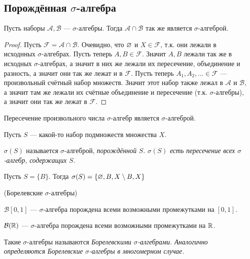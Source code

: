 \subsection{Порождённая $\sigma$-алгебра}
\begin{proposal}
    Пусть наборы $\mathcal{A}, \mathcal{B}$ --- $\sigma$-алгебры. Тогда $\mathcal{A} \cap \mathcal{B}$
    так же является $\sigma$-алгеброй.
\end{proposal}
\begin{proof}
    Пусть $\mathcal{F} = \mathcal{A} \cap \mathcal{B}$. Очевидно, что $\varnothing$ и $X \in \mathcal{F}$,
    т.к. они лежали в исходнных $\sigma$-алгебрах. Пусть теперь $A, B \in \mathcal{F}$. Значит $A, B$
    лежали так же в исходных $\sigma$-алгебрах, а значит в них же лежали их пересечение, объединение и
    разность, а значит они так же лежат и в $\mathcal{F}$. Пусть теперь $A_1, A_2, \ldots \in \mathcal{F}$
    --- произвольный счётный набор множеств. Значит этот набор также лежал в $\mathcal{A}$ и $\mathcal{B}$,
    а значит там же лежали их счётные объединение и пересечение (т.к. $\sigma$-алгебры), а значит они
    так же лежат в $\mathcal{F}$.
\end{proof}
\begin{corollary}
    Пересечение произвольного числа $\sigma$-алгебр является $\sigma$-алгеброй.
\end{corollary}
Пусть $S$ --- какой-то набор подмножеств множества $X$.
\begin{definition}
    $\sigma(S)$ называется $\sigma$-алгеброй, \it{порождённой} $S$. $\sigma(S)$ есть пересечение всех
    $\sigma$-алгебр, содержащих $S$.
\end{definition}
\begin{example}
    Пусть $S = \{B\}$. Тогда $\sigma(S) = \{\varnothing, B, X \setminus B, X\}$
\end{example}
\begin{example}
    (Борелевские $\sigma$-алгебры)

    $\mathcal{B}[0, 1]$ --- $\sigma$-алгебра порождена всеми возможными промежутками на $[0 ,1]$.

    $\mathcal{B}(\mathbb{R})$ --- $\sigma$-алгебра порождена всеми возможными промежутками на $\mathbb{R}$.

    Такие $\sigma$-алгебры называются \it{Борелевскими $\sigma$-алгебрами}. Аналогично определяются
    Борелевские $\sigma$-алгебры в многомерном случае.
\end{example}
